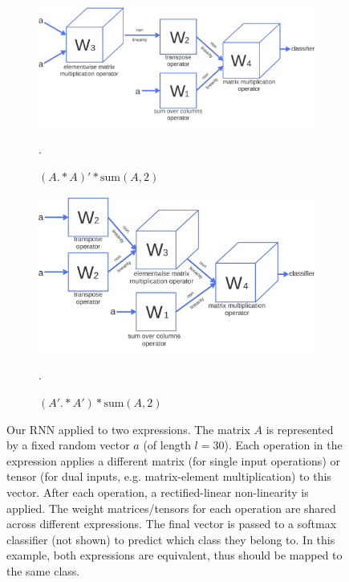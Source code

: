 \documentclass{article} %
\begin{document}
\begin{figure}[h!]
\vspace{-5.5mm}
\begin{center}
\begin{subfigure}[b]{0.45\textwidth}
\includegraphics[width=\textwidth]{figs/tnn.png}
\caption{$(A .* A)' * \text{sum}(A, 2)$}.
\end{subfigure}
\quad
\quad
\quad
\begin{subfigure}[b]{0.45\textwidth}
\includegraphics[width=\textwidth]{figs/tnn2.png}
\caption{ $(A' .* A') * \text{sum}(A, 2)$}.
\end{subfigure}
\end{center}
\vspace{-5mm}
\caption{Our RNN applied to two expressions. The matrix $A$
  is represented by a fixed random vector $a$ (of length $l=30$). Each
  operation in the expression applies a different matrix (for single
  input operations) or tensor (for dual inputs, e.g. matrix-element multiplication) to this vector. After
  each operation, a rectified-linear non-linearity is applied. The weight
  matrices/tensors for each operation are shared across different
  expressions. The final vector is passed to a softmax classifier (not
  shown) to predict which class they belong to. In this example, both
  expressions are equivalent, thus should be mapped to the same class.}
\label{fig:rnn}
\vspace{-2mm}
\end{figure}
\end{document}
